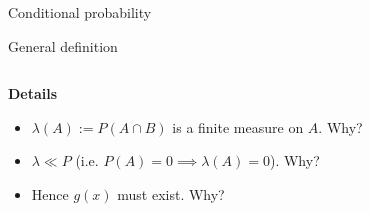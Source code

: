 \documentclass[10pt]{beamer}
\begin{document}
\begin{frame}{Conditional probability}
\begin{sblock}{General definition}
\begin{columns}
\begin{column}{0.5\textwidth}
{\scriptsize 
\textbf{Details}
\begin{itemize}
\item $\lambda(A):=P(A \cap B)$ is a finite measure on $A$. \quad Why? %
\item $\lambda \ll P$ (i.e. $P(A) = 0 \implies \lambda(A)=0$).  \quad Why?  %
\item Hence $g(x)$ must exist. \quad Why?	%
\end{itemize}
}
\end{column} 


\end{columns} 
\end{sblock}

	
\end{frame}
\end{document}
